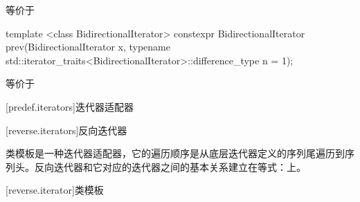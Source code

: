 \begin{itemdescr}
\pnum
\effects
等价于
\end{itemdescr}

%
\begin{itemdecl}
template <class BidirectionalIterator>
  constexpr BidirectionalIterator prev(BidirectionalIterator x,
    typename std::iterator_traits<BidirectionalIterator>::difference_type n = 1);
\end{itemdecl}

\begin{itemdescr}
\pnum
\effects
等价于
\end{itemdescr}

[predef.iterators]{迭代器适配器}

[reverse.iterators]{反向迭代器}

\pnum
类模板是一种迭代器适配器，它的遍历顺序是从底层迭代器定义的序列尾遍历到序列头。反向迭代器和它对应的迭代器之间的基本关系建立在等式：上。

[reverse.iterator]{类模板}

